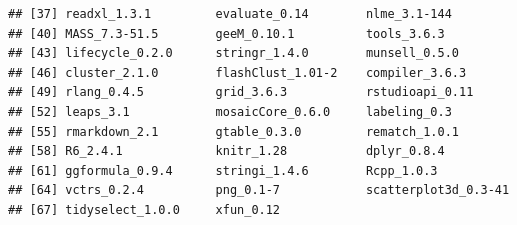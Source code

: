 \documentclass[
]{krantz}
\begin{document}
\begin{verbatim}
## [37] readxl_1.3.1         evaluate_0.14        nlme_3.1-144        
## [40] MASS_7.3-51.5        geeM_0.10.1          tools_3.6.3         
## [43] lifecycle_0.2.0      stringr_1.4.0        munsell_0.5.0       
## [46] cluster_2.1.0        flashClust_1.01-2    compiler_3.6.3      
## [49] rlang_0.4.5          grid_3.6.3           rstudioapi_0.11     
## [52] leaps_3.1            mosaicCore_0.6.0     labeling_0.3        
## [55] rmarkdown_2.1        gtable_0.3.0         rematch_1.0.1       
## [58] R6_2.4.1             knitr_1.28           dplyr_0.8.4         
## [61] ggformula_0.9.4      stringi_1.4.6        Rcpp_1.0.3          
## [64] vctrs_0.2.4          png_0.1-7            scatterplot3d_0.3-41
## [67] tidyselect_1.0.0     xfun_0.12
\end{verbatim}

\cleardoublepage

  

\backmatter
\printindex
\end{document}
